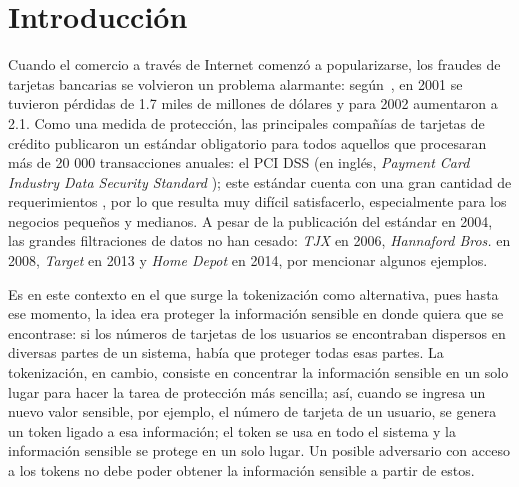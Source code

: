 %
%

\section{Introducción}


Cuando el comercio a través de Internet comenzó a popularizarse, los fraudes de
tarjetas bancarias se volvieron un problema alarmante: según~\cite{wallethub},
en 2001 se tuvieron pérdidas de 1.7 miles de millones de dólares y para 2002
aumentaron a 2.1. Como una medida de protección, las principales compañías de
tarjetas de crédito publicaron un estándar obligatorio para todos aquellos que
procesaran más de 20 000 transacciones anuales: el PCI DSS (en inglés,
\textit{Payment Card Industry Data Security Standard} \cite{pci_dss}); este
estándar cuenta con una gran cantidad de requerimientos \cite{search_security,
uk_association}, por lo que resulta muy difícil satisfacerlo, 
especialmente para los negocios pequeños y medianos. A pesar de la publicación
del estándar en 2004, las grandes filtraciones de datos no han cesado:
\textit{TJX} en 2006, \textit{Hannaford Bros.} en 2008, \textit{Target} en
2013 y \textit{Home Depot} en 2014, por mencionar algunos ejemplos.


Es en este contexto en el que surge la tokenización como alternativa, pues hasta
ese momento, la idea era proteger la información sensible en donde
quiera que se encontrase: si los números de tarjetas de los usuarios se
encontraban dispersos en diversas partes de un sistema, había que proteger todas
esas partes. La tokenización, en cambio, consiste en concentrar la información
sensible en un solo lugar para hacer la tarea de protección más sencilla; así,
cuando se ingresa un nuevo valor sensible, por ejemplo, el número de tarjeta
de un usuario, se genera un token ligado a esa información; el token se usa en
todo el sistema y la información sensible se protege en un solo lugar. Un
posible adversario con acceso a los tokens no debe poder obtener la información
sensible a partir de estos.

